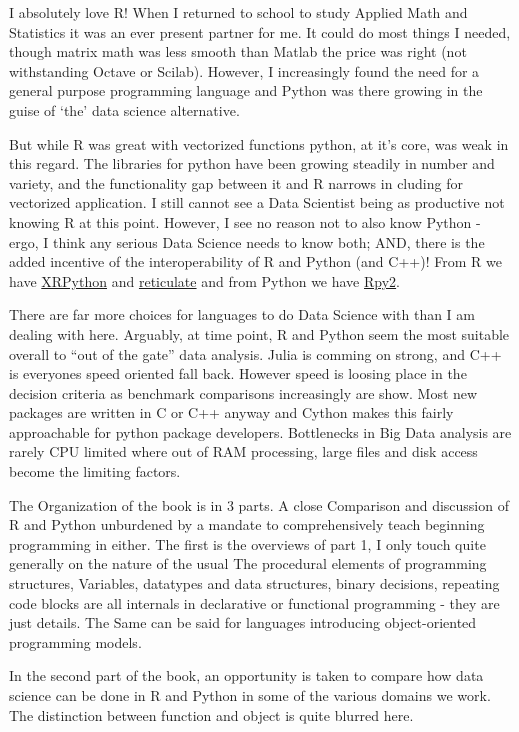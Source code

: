 \documentclass[]{book}
\theoremstyle{definition}
\theoremstyle{definition}
\theoremstyle{definition}
\theoremstyle{remark}
\begin{document}
I absolutely love R! When I returned to school to study Applied Math and
Statistics it was an ever present partner for me. It could do most
things I needed, though matrix math was less smooth than Matlab the
price was right (not withstanding Octave or Scilab). However, I
increasingly found the need for a general purpose programming language
and Python was there growing in the guise of `the' data science
alternative.

But while R was great with vectorized functions python, at it's core,
was weak in this regard. The libraries for python have been growing
steadily in number and variety, and the functionality gap between it and
R narrows in cluding for vectorized application. I still cannot see a
Data Scientist being as productive not knowing R at this point. However,
I see no reason not to also know Python - ergo, I think any serious Data
Science needs to know both; AND, there is the added incentive of the
interoperability of R and Python (and C++)! From R we have
\href{https://cran.cnr.berkeley.edu/web/packages/XRPython/index.html}{XRPython}
and
\href{https://cran.cnr.berkeley.edu/web/packages/reticulate/index.html}{reticulate}
and from Python we have \href{https://rpy2.bitbucket.io/}{Rpy2}.

There are far more choices for languages to do Data Science with than I
am dealing with here. Arguably, at time point, R and Python seem the
most suitable overall to ``out of the gate'' data analysis. Julia is
comming on strong, and C++ is everyones speed oriented fall back.
However speed is loosing place in the decision criteria as benchmark
comparisons increasingly are show. Most new packages are written in C or
C++ anyway and Cython makes this fairly approachable for python package
developers. Bottlenecks in Big Data analysis are rarely CPU limited
where out of RAM processing, large files and disk access become the
limiting factors.

The Organization of the book is in 3 parts. A close Comparison and
discussion of R and Python unburdened by a mandate to comprehensively
teach beginning programming in either. The first is the overviews of
part 1, I only touch quite generally on the nature of the usual The
procedural elements of programming structures, Variables, datatypes and
data structures, binary decisions, repeating code blocks are all
internals in declarative or functional programming - they are just
details. The Same can be said for languages introducing object-oriented
programming models.

In the second part of the book, an opportunity is taken to compare how
data science can be done in R and Python in some of the various domains
we work. The distinction between function and object is quite blurred
here.
\end{document}
